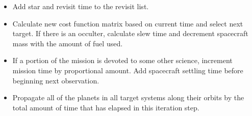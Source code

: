 \begin{enumerate}
\begin{itemize}
\item Add star and revisit time to the revisit list.
\item Calculate new cost function matrix based on current time and select next target.  If there is an occulter, calculate slew time and decrement spacecraft mass with the amount of fuel used.
\item If a portion of the mission is devoted to some other science, increment mission time by proportional amount.  Add spacecraft settling time before beginning next observation.
\item Propagate all of the planets in all target systems along their orbits by the total amount of time that has elapsed in this iteration step.
\end{itemize}
\end{enumerate}

